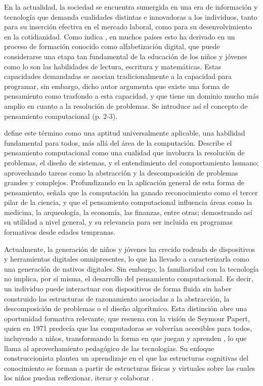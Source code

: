 
En la actualidad, la sociedad se encuentra sumergida en una era de información y tecnología que demanda cualidades distintas e innovadoras a los individuos, tanto para su inserción efectiva en el mercado laboral, como para su desenvolvimiento en la cotidianidad. Como indica , en muchos países esto ha derivado en un proceso de formación conocido como alfabetización digital, que puede considerarse una etapa tan fundamental de la educación de los niños y jóvenes como lo son las habilidades de lectura, escritura y matemáticas. Estas capacidades demandadas se asocian tradicionalmente a la capacidad para programar, sin embargo, dicho autor argumenta que existe una forma de pensamiento como trasfondo a esta capacidad, y que tiene un dominio mucho más amplio en cuanto a la resolución de problemas. Se introduce así el concepto de pensamiento computacional (p. 2-3).

 define este término como una aptitud universalmente aplicable, una habilidad fundamental para todos, más allá del área de la computación. Describe el pensamiento computacional como una cualidad que involucra la resolución de problemas, el diseño de sistemas, y el entendimiento del comportamiento humano; aprovechando tareas como la abstracción y la descomposición de problemas grandes y complejos. Profundizando en la aplicación general de esta forma de pensamiento,  señala que la computación ha ganado reconocimiento como el tercer pilar de la ciencia, y que el pensamiento computacional influencia áreas como la medicina, la arqueología, la economía, las finanzas, entre otras; demostrando así su utilidad a nivel general, y su relevancia para ser incluida en programas formativos desde edades tempranas.

Actualmente, la generación de niños y jóvenes ha crecido rodeada de dispositivos y herramientas digitales omnipresentes, lo que ha llevado a caracterizarla como una generación de nativos digitales. Sin embargo, la familiaridad con la tecnología no implica, por sí misma, el desarrollo del pensamiento computacional. Es decir, un individuo puede interactuar con dispositivos de forma fluida sin haber construido las estructuras de razonamiento asociadas a la abstracción, la descomposición de problemas o el diseño algorítmico. Esta distinción abre una oportunidad formativa relevante, que resuena con la visión de Seymour Papert, quien en 1971 predecía que las computadoras se volverían accesibles para todos, incluyendo a niños, transformando la forma en que juegan y aprenden \cite{resnick2012}, lo que llama al aprovechamiento pedagógico de las tecnologías. Su enfoque construccionista plantea un aprendizaje en el que las estructuras cognitivas del conocimiento se forman a partir de estructuras físicas y virtuales sobre las cuales los niños puedan reflexionar, iterar y colaborar \cite{nosshoyles2019}.

